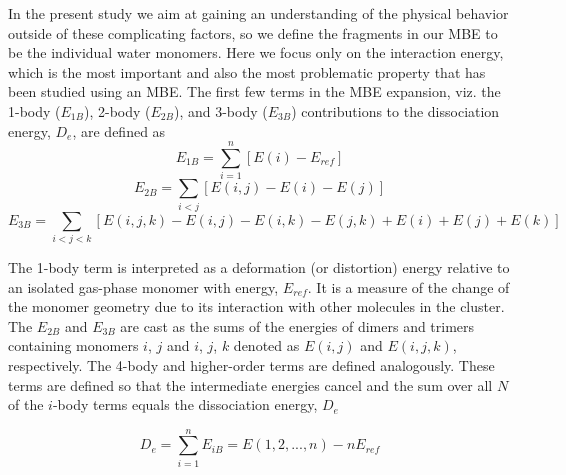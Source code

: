 \documentclass[11pt, proquest]{uwthesis}[2020/02/24]
\begin{document}
\par In the present study we aim at gaining an understanding of the physical behavior outside of these complicating factors, so we define the fragments in our MBE to be the individual water monomers. Here we focus only on the interaction energy, which is the most important and also the most problematic property that has been studied using an MBE. The first few terms in the MBE expansion, viz. the 1-body ($E_{1B}$), 2-body ($E_{2B}$), and 3-body ($E_{3B}$) contributions to the dissociation energy, $D_e$, are defined as\autocite{hankins_hydrogen-bond_1970, xantheas_ab_1994}
$$
E_{1B}=\sum_{i=1}^n[E(i)-E_{ref}]
$$
$$
E_{2B}=\sum_{i<j}[E(i,j)-E(i)-E(j)]
$$
$$
E_{3B}=\sum_{i<j<k}[E(i,j,k)-E(i,j)-E(i,k)-E(j,k)+E(i)+E(j)+E(k)]
$$

The 1-body term is interpreted as a deformation (or distortion) energy\autocite{white_analysis_1990, xantheas_importance_1996} relative to an isolated gas-phase monomer with energy, $E_{ref}$. It is a measure of the change of the monomer geometry due to its interaction with other molecules in the cluster. The $E_{2B}$ and $E_{3B}$ are cast as the sums of the energies of dimers and trimers containing monomers $i$, $j$ and $i$, $j$, $k$ denoted as $E(i,j)$ and $E(i,j,k)$, respectively. The 4-body and higher-order terms are defined analogously. These terms are defined so that the intermediate energies cancel and the sum over all $N$ of the $i$-body terms equals the dissociation energy, $D_e$

$$
D_e=\sum_{i=1}^nE_{iB}=E(1,2,...,n)-nE_{ref}
$$
\end{document}
